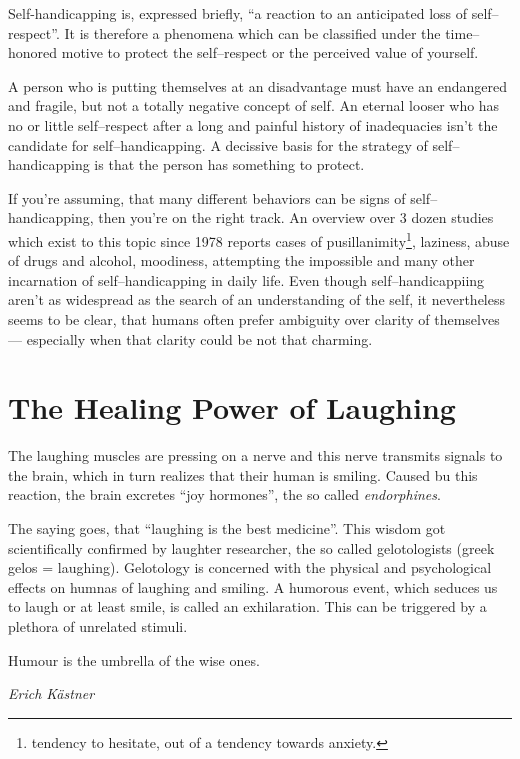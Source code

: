 \documentclass[../Book.Stress_regulation.tex]{subfiles}
\begin{document}
{  Self-handicapping is, expressed briefly, ``a reaction to an anticipated loss of self--respect''.
  It is therefore a phenomena which can be classified under the time--honored motive to protect the self--respect or the perceived value of yourself.

  A person who is putting themselves at an disadvantage must have an endangered and fragile, but not a totally negative concept of self.
  An eternal looser who has no or little self--respect after a long and painful history of inadequacies isn't the candidate for self--handicapping.
  A decissive basis for the strategy of self--handicapping is that the person has something to protect.

  If you're assuming, that many different behaviors can be signs of self--handicapping, then you're on the right track.
  An overview over 3 dozen studies which exist to this topic since 1978 reports cases of pusillanimity\footnote{tendency to hesitate, out of a tendency towards anxiety.},
  laziness, abuse of drugs and alcohol, moodiness, attempting the impossible and many other incarnation of self--handicapping in daily life.
  Even though self--handicappiing aren't as widespread as the search of an understanding of the self,
  it nevertheless seems to be clear, that humans often prefer ambiguity over clarity of themselves ---
  especially when that clarity could be not that charming.
}

\chapter{The Healing Power of Laughing}

The laughing muscles are pressing on a nerve and this nerve transmits signals to the brain, which in turn realizes that their human is smiling.
Caused bu this reaction, the brain excretes ``joy hormones'', the so called \emph{endorphines}.

The saying goes, that ``laughing is the best medicine''.
This wisdom got scientifically confirmed by laughter researcher, the so called gelotologists (greek gelos = laughing).
Gelotology is concerned with the physical and psychological effects on humnas of laughing and smiling.
A humorous event, which seduces us to laugh or at least smile, is called an exhilaration.
This can be triggered by a plethora of unrelated stimuli.

\epigraph{Humour is the umbrella of the wise ones.}{\textit{Erich K\"astner}}
\end{document}
